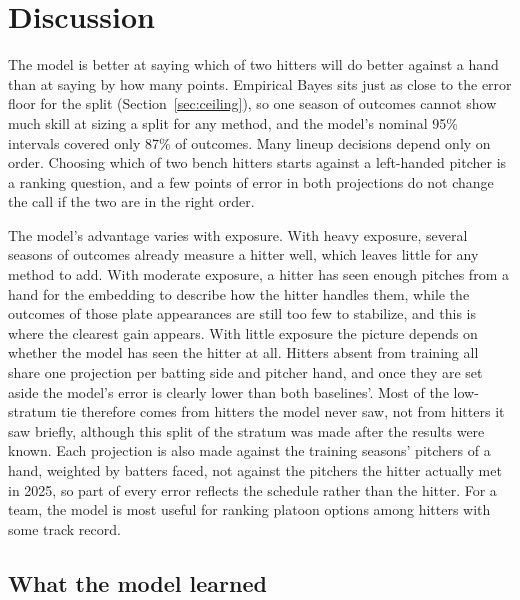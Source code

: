 \documentclass[11pt,letterpaper]{article}
\let\oldsubsection\subsection
\renewcommand\subsection{\FloatBarrier\oldsubsection}
\begin{document}
\section{Discussion}
\label{sec:discussion}\label{sec:ordering}

The model is better at saying which of two hitters will do better against a hand than at saying by how many points. Empirical Bayes sits just as close to the error floor for the split (Section~\ref{sec:ceiling}), so one season of outcomes cannot show much skill at sizing a split for any method, and the model's nominal 95\% intervals covered only 87\% of outcomes. Many lineup decisions depend only on order. Choosing which of two bench hitters starts against a left-handed pitcher is a ranking question, and a few points of error in both projections do not change the call if the two are in the right order.

The model's advantage varies with exposure. With heavy exposure, several seasons of outcomes already measure a hitter well, which leaves little for any method to add. With moderate exposure, a hitter has seen enough pitches from a hand for the embedding to describe how the hitter handles them, while the outcomes of those plate appearances are still too few to stabilize, and this is where the clearest gain appears. With little exposure the picture depends on whether the model has seen the hitter at all. Hitters absent from training all share one projection per batting side and pitcher hand, and once they are set aside the model's error is clearly lower than both baselines'. Most of the low-stratum tie therefore comes from hitters the model never saw, not from hitters it saw briefly, although this split of the stratum was made after the results were known. Each projection is also made against the training seasons' pitchers of a hand, weighted by batters faced, not against the pitchers the hitter actually met in 2025, so part of every error reflects the schedule rather than the hitter. For a team, the model is most useful for ranking platoon options among hitters with some track record.

\subsection{What the model learned}
\label{sec:embedding}
\end{document}
